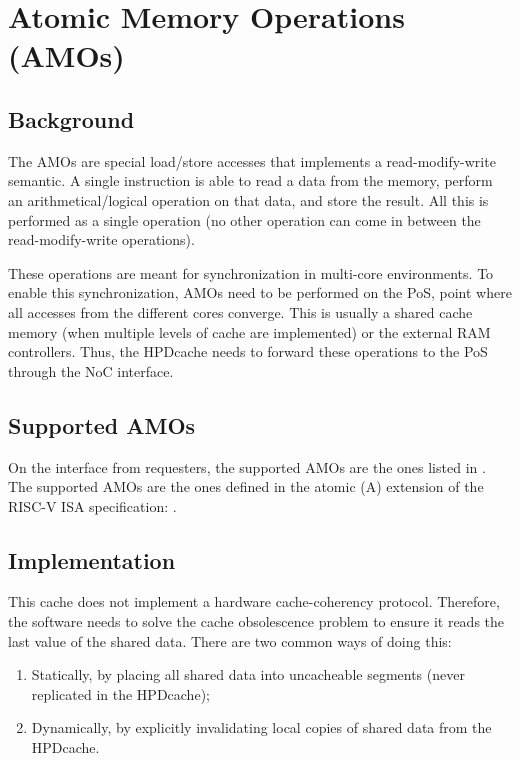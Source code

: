 \documentclass[10pt,titlepage,twoside]{book}
\begin{document}
\chapter{Atomic Memory Operations (AMOs)}
\minitoc
\newpage

\section{Background}

The \acp{AMO} are special load/store accesses that implements a read-modify-write semantic.
A single instruction is able to read a data from the memory, perform an arithmetical/logical operation on that data, and store the result.
All this is performed as a single operation (no other operation can come in between the read-modify-write operations).

These operations are meant for synchronization in multi-core environments.
To enable this synchronization, \acp{AMO} need to be performed on the \acf{PoS}, point where all accesses from the different cores converge.
This is usually a shared cache memory (when multiple levels of cache are implemented) or the external RAM controllers.
Thus, the \ac{HPDcache} needs to forward these operations to the \ac{PoS} through the \ac{NoC} interface.

\section{Supported \acp*{AMO}}

On the interface from requesters, the supported \acp{AMO} are the ones listed in .
The supported \acp{AMO} are the ones defined in the atomic (A) extension of the RISC-V ISA specification: \cite{RISCV_spec}.


\section{Implementation}

This cache does not implement a hardware cache-coherency protocol.
Therefore, the software needs to solve the cache obsolescence problem to ensure it reads the last value of the shared data.
There are two common ways of doing this:
\begin{enumerate}
\item Statically, by placing all shared data into uncacheable segments (never replicated in the \ac{HPDcache});

\item Dynamically, by explicitly invalidating local copies of shared data from the \ac{HPDcache}.
\end{enumerate}
\end{document}
